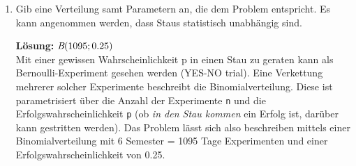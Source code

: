 \documentclass[11pt, a4paper]{article}
\begin{document}
\begin{enumerate}[label=\alph*)]
	\item Gib eine Verteilung samt Parametern an, die dem Problem entspricht. Es kann angenommen werden, dass Staus statistisch unabhängig sind.
	
	\textbf{Lösung:} $\emph{B}(1095;0.25)$ \\
	Mit einer gewissen Wahrscheinlichkeit p in einen Stau zu geraten kann als Bernoulli-Experiment gesehen werden (YES-NO trial). Eine Verkettung mehrerer solcher Experimente beschreibt die Binomialverteilung. Diese ist parametrisiert über die Anzahl der Experimente \texttt{n} und die Erfolgswahrscheinlichkeit \texttt{p} (ob \emph{in den Stau kommen} ein Erfolg ist, darüber kann gestritten werden). Das Problem lässt sich also beschreiben mittels einer Binomialverteilung mit 6 Semester = 1095 Tage Experimenten und einer Erfolgswahrscheinlichkeit von 0.25.
	

\end{enumerate}
\end{document}
